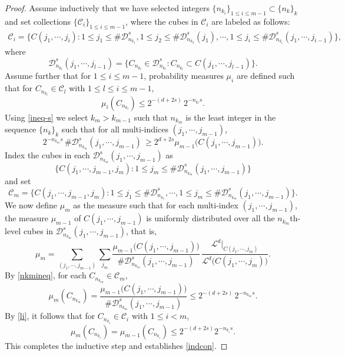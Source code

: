 \documentclass[12pt]{article}
\newcommand{\1}{{\bf 1}}
\newcommand{\D}{\mathcal{D}}
\begin{document}
\begin{proof}
	Assume inductively that we have selected  integers $\{n_{k_i}\}_{1\leq i\leq m-1}\subset \{n_k\}_k$ and  set collections $\{\mathcal{C}_{i}\}_{1\leq i\leq m-1}$, where the cubes in $\mathcal{C}_{i}$ are labeled as follows:
	\begin{align*}
		\mathcal{C}_{i}=\big\{C(j_1,\cdots,j_i):1\leq j_1\leq \#\D_{n_{k_1}}^s,1\leq j_2\leq\#\D_{n_{k_2}}^s(j_1),\cdots, 1\leq j_i\leq\#\D_{n_{k_i}}^s(j_1,\cdots,j_{i-1})\big\},
	\end{align*}
	where 
	$$\D_{n_{k_l}}^s(j_1,\cdots,j_{l-1})=\{C_{n_{k_l}}\in \D_{n_{k_l}}^s:
	C_{n_{k_l}} \subset C(j_1,\cdots,j_{l-1})\}.$$
	Assume further that  for $1\leq i\leq m-1$, probability measures $ \mu_i $ are  defined such that 	for  $C_{n_{k_l}}\in\mathcal{C}_{l}$ with $1\leq l\leq i\leq m-1$,
	\begin{equation}\label{li}
		\mu_i(C_{n_{k_l}})\leq 2^{-(d+2s)}\,2^{-n_{k_l}s}.
	\end{equation}
	Using \eqref{ineq-s} we select $k_m>k_{m-1}$ such that $n_{k_m}$ is the least integer in the sequence $\{n_k\}_k$ such that  for all multi-indices  $(j_1,\cdots,j_{m-1})$,
	\begin{equation}\label{nkmineq}
			2^{-{n_{k_m}}s}\,\#\D_{n_{k_m}}^s(j_1,\cdots,j_{m-1})\, \geq 2^{d+2s}\mu_{m-1}\big(C(j_1,\cdots,j_{m-1})\big).
	\end{equation}
		Index the cubes in each  $\D_{n_{k_m}}^s(j_1,\cdots, j_{m-1})$ as
		 $$\big\{C(j_1,\cdots, j_{m-1},j_m):1\leq j_m\leq \#\D_{n_{k_m}}^s(j_1,\cdots, j_{m-1})\big\}$$
	and set
	\begin{equation*}
		\mathcal{C}_{m}=\big\{C(j_1,\cdots, j_{m-1},j_m):1\leq j_1\leq \#\D_{n_{k_1}}^s,\cdots, 1\leq j_m\leq \#\D_{n_{k_m}}^s(j_1,\cdots, j_{m-1})\big\}.
	\end{equation*}	
	We now define $\mu_m$ 	as the measure such that for each multi-index  $(j_1,\cdots,j_{m-1})$, the measure $\mu_{m-1}$ of  $C(j_1,\cdots, j_{m-1})$  is uniformly distributed over all the $n_{k_m}$th-level cubes in $\D_{n_{k_m}}^s(j_1,\cdots, j_{m-1})$, that is,
	\begin{equation}\label{mum}
		\mu_m=\sum_{(j_1,\cdots,j_{m-1})}\sum_{j_m}\frac{\mu_{m-1}\big(C(j_1,\cdots, j_{m-1})\big)}{\#\D_{n_{k_m}}^s(j_1,\cdots, j_{m-1})}\, \dfrac{\mathcal{L}^d|_{C(j_1,\cdots,j_m)}}{\mathcal{L}^d\big(C(j_1,\cdots,j_m)\big)}.
	\end{equation}
	By \eqref{nkmineq}, for   each $C_{n_{k_m}}\in\mathcal{C}_m$,
	\begin{equation*}
		\mu_m(C_{n_{k_m}})=\frac{\mu_{m-1}\big(C(j_1,\cdots, j_{m-1})\big)}{\#\D_{n_{k_m}}^s(j_1,\cdots, j_{m-1})}\leq 2^{-(d+2s)}\, 2^{-n_{k_m}s}.
	\end{equation*}
	By \eqref{li},  it follows  that for $C_{n_{k_i}}\in\mathcal{C}_i$ with  $1\leq i<m$,
	\begin{equation*}
		\mu_m(C_{n_{k_i}})=\mu_{m-1}(C_{n_{k_i}})\leq 2^{-(d+2s)}2^{-n_{k_i}s}.
	\end{equation*}
This completes the inductive step and establishes \eqref{indcon}.	 
	 

\end{proof}
\end{document}
